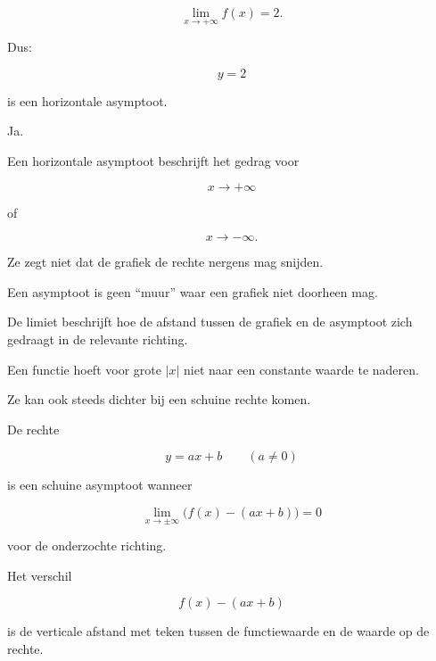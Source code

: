\documentclass{ximera}
\begin{document}
\[
\lim_{x\to+\infty}f(x)=2.
\]

Dus:

\[
\boxed{y=2}
\]

is een horizontale asymptoot.




Ja.

Een horizontale asymptoot beschrijft het gedrag voor

\[
x\to+\infty
\]

of

\[
x\to-\infty.
\]

Ze zegt niet dat de grafiek de rechte nergens mag snijden.

\begin{opmerking}
Een asymptoot is geen ``muur'' waar een grafiek niet doorheen mag.

De limiet beschrijft hoe de afstand tussen de grafiek en de
asymptoot zich gedraagt in de relevante richting.
\end{opmerking}




Een functie hoeft voor grote $|x|$ niet naar een constante waarde te
naderen.

Ze kan ook steeds dichter bij een schuine rechte komen.

\begin{definitie}

De rechte

\[
\boxed{y=ax+b}
\qquad (a\neq0)
\]

is een schuine asymptoot wanneer

\[
\boxed{
\lim_{x\to\pm\infty}
\bigl(f(x)-(ax+b)\bigr)=0
}
\]

voor de onderzochte richting.

\end{definitie}

Het verschil

\[
f(x)-(ax+b)
\]

is de verticale afstand met teken tussen de functiewaarde en de
waarde op de rechte.
\end{document}
